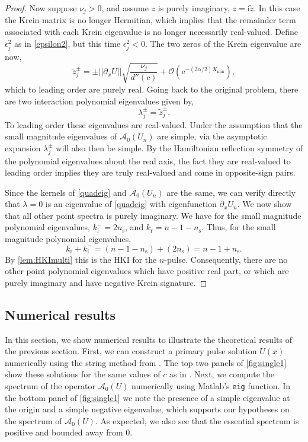 \documentclass[review,onefignum,onetabnum]{siamart171218}
\newcommand{\rme}{\mathrm{e}}
\newcommand{\rmi}{\mathrm{i}}
\newcommand{\rmr}{\mathrm{r}}
\newcommand{\rms}{\mathrm{s}}
\newcommand{\calA}{\mathcal{A}}
\begin{document}
\begin{proof}
Now suppose $\nu_j > 0$, and assume $z$ is purely imaginary, $z=\rmi\tilde{z}$. In this case the Krein matrix is no longer Hermitian, which implies that the remainder term associated with each Krein eigenvalue is no longer necessarily real-valued. Define $\epsilon_j^2$ as in \cref{epsilon2}, but this time $\epsilon_j^2 < 0$. The two zeros of the Krein eigenvalue are now,
\[
\tilde{z}_j^\pm = \pm||\partial_xU|| \sqrt{ \frac{ \nu_j}{d''(c)} } + \mathcal{O}(\rme^{-(3 \alpha/2) X_{\mathrm{min}}}),
\]
which to leading order are purely real. Going back to the original problem, there are two interaction polynomial eigenvalues given by,
\[
\lambda_j^\pm=\tilde{z}_j^\pm.
\]
To leading order these eigenvalues are real-valued. Under the assumption that the small magnitude eigenvalues of $\calA_0(U_n)$ are simple, via the asymptotic expansion $\lambda_j^\pm$ will also then be simple. By the Hamiltonian reflection symmetry of the polynomial eigenvalues about the real axis, the fact they are real-valued to leading order implies they are truly real-valued and come in opposite-sign pairs.

Since the kernels of \cref{quadeig} and $\calA_0(U_n)$ are the same, we can verify directly that $\lambda = 0$ is an eigenvalue of \cref{quadeig} with eigenfunction $\partial_x U_n$. We now show that all other point spectra is purely imaginary. We have for the small magnitude polynomial eigenvalues, $k_\rmi^-=2n_\rms$, and $k_\rmr=n-1-n_\rms$. Thus, for the small magnitude polynomial eigenvalues,
\[
k_\rmr+k_\rmi^-=(n-1-n_\rms)+(2n_\rms)=n-1+n_\rms.
\]
By \cref{lem:HKImulti} this is the HKI for the $n$-pulse. Consequently, there are no other point polynomial eigenvalues which have positive real part, or which are purely imaginary and have negative Krein signature.
\end{proof}

\subsection{Numerical results}\label{sec:numerics}

In this section, we show numerical results to illustrate the theoretical results of the previous section. First, we can construct a primary pulse solution $U(x)$ numerically using the string method from \cite{Chamard2011}. The top two panels of \cref{fig:single1} show these solutions for the same values of $c$ as in \cite[Figure 3]{Chen1997}. Next, we compute the spectrum of the operator $\calA_0(U)$ numerically using Matlab's \texttt{eig} function. In the bottom panel of \cref{fig:single1} we note the presence of a simple eigenvalue at the origin and a simple negative eigenvalue, which supports our hypotheses on the spectrum of $\calA_0(U)$. As expected, we also see that the essential spectrum is positive and bounded away from 0.
\end{document}
